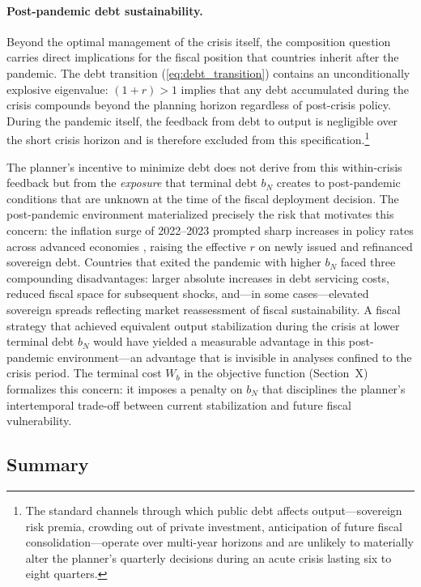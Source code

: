 \paragraph{Post-pandemic debt sustainability.}

Beyond the optimal management of the crisis itself, the composition question carries
direct implications for the fiscal position that countries inherit after the pandemic.
The debt transition (\ref{eq:debt_transition}) contains an unconditionally explosive
eigenvalue: $(1+r) > 1$ implies that any debt accumulated during the crisis compounds
beyond the planning horizon regardless of post-crisis policy. During the pandemic
itself, the feedback from debt to output is negligible over the short crisis horizon
and is therefore excluded from this specification.\footnote{The standard channels
through which public debt affects output---sovereign risk premia, crowding out of
private investment, anticipation of future fiscal consolidation---operate over
multi-year horizons and are unlikely to materially alter the planner's quarterly
decisions during an acute crisis lasting six to eight quarters.}

The planner's incentive to minimize debt does not derive from this within-crisis
feedback but from the \textit{exposure} that terminal debt $b_N$ creates to
post-pandemic conditions that are unknown at the time of the fiscal deployment
decision. The post-pandemic environment materialized precisely the risk that motivates
this concern: the inflation surge of 2022--2023 prompted sharp increases in policy
rates across advanced economies \citep{jorda2023}, raising the effective $r$ on newly
issued and refinanced sovereign debt. Countries that exited the pandemic with higher
$b_N$ faced three compounding disadvantages: larger absolute increases in debt
servicing costs, reduced fiscal space for subsequent shocks, and---in some
cases---elevated sovereign spreads reflecting market reassessment of fiscal
sustainability. A fiscal strategy that achieved equivalent output stabilization during
the crisis at lower terminal debt $b_N$ would have yielded a measurable advantage in
this post-pandemic environment---an advantage that is invisible in analyses confined to
the crisis period. The terminal cost $W_b$ in the objective function (Section~X)
formalizes this concern: it imposes a penalty on $b_N$ that disciplines the planner's
intertemporal trade-off between current stabilization and future fiscal vulnerability.


\subsection*{Summary}

